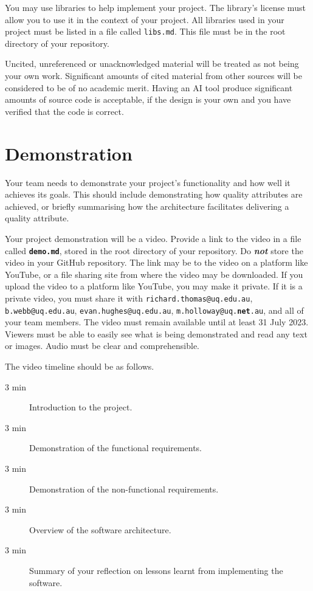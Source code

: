\documentclass{csse4400}
\begin{document}
You may use libraries to help implement your project.
The library's license must allow you to use it in the context of your project.
All libraries used in your project must be listed in a file called \texttt{libs.md}.
This file must be in the root directory of your repository.

Uncited, unreferenced or unacknowledged material will be treated as not being your own work.
Significant amounts of cited material from other sources will be considered to be of no academic merit.
Having an AI tool produce significant amounts of source code is acceptable,
if the design is your own and you have verified that the code is correct.


\section{Demonstration}
Your team needs to demonstrate your project's functionality and how well it achieves its goals.
This should include demonstrating how quality attributes are achieved,
or briefly summarising how the architecture facilitates delivering a quality attribute.

Your project demonstration will be a video.
Provide a link to the video in a file called \textbf{\texttt{demo.md}}, stored in the root directory of your repository.
Do \textbf{\textit{not}} store the video in your GitHub repository.
The link may be to the video on a platform like YouTube, or a file sharing site from where the video may be downloaded.
If you upload the video to a platform like YouTube, you may make it private.
If it is a private video, you must share it with \texttt{richard.thomas@uq.edu.au}, \texttt{b.webb@uq.edu.au},
\texttt{evan.hughes@uq.edu.au}, \texttt{m.holloway@uq.\textbf{net}.au}, and all of your team members.
The video must remain available until at least 31 July 2023.
Viewers must be able to easily see what is being demonstrated and read any text or images.
Audio must be clear and comprehensible.

The video timeline should be as follows.

\begin{description}
    \item[3 min] Introduction to the project.
    \item[3 min] Demonstration of the functional requirements.
    \item[3 min] Demonstration of the non-functional requirements.
    \item[3 min] Overview of the software architecture.
    \item[3 min] Summary of your reflection on lessons learnt from implementing the software.
\end{description}
\end{document}
